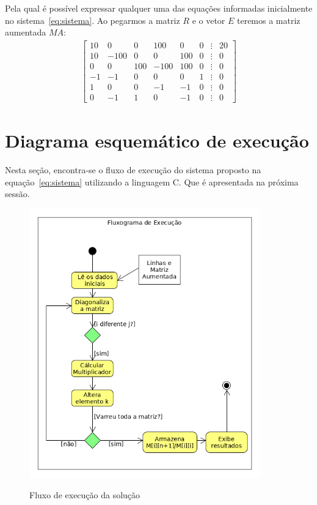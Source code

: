 \documentclass[12pt, hidelinks]{article}
\begin{document}
Pela qual é possível expressar qualquer uma das equações informadas inicialmente no sistema~\eqref{eq:sistema}. Ao pegarmos a
matriz $R$ e o vetor $E$ teremos a matriz aumentada $MA$:
\begin{eqnarray}\label{eq:matrizes3}
\left[\begin{array}{rrrrrrrr}
10 & 0 & 0 & 100 & 0 & 0 & \vdots & 20\\
10 & -100 & 0 & 0 & 100 & 0 & \vdots & 0\\
0 & 0 & 100 & -100 & 100 & 0 & \vdots & 0\\
-1 & -1 & 0 & 0 & 0 & 1 & \vdots & 0\\
1 & 0 & 0 & -1 & -1 & 0 & \vdots & 0\\
0 & -1 & 1 & 0 & -1 & 0 & \vdots & 0
\end{array}\right]
\end{eqnarray}

\newpage
\section{Diagrama esquemático de execução}

Nesta seção, encontra-se o fluxo de execução do sistema proposto na equação~\eqref{eq:sistema} utilizando
a linguagem C. Que é apresentada na próxima sessão.

\begin{figure}[!h]
  \centering
  \includegraphics[width=10cm]{figuras/fluxograma.png}\\
  \caption{Fluxo de execução da solução}\label{fig:fluxo}
\end{figure}
\end{document}
